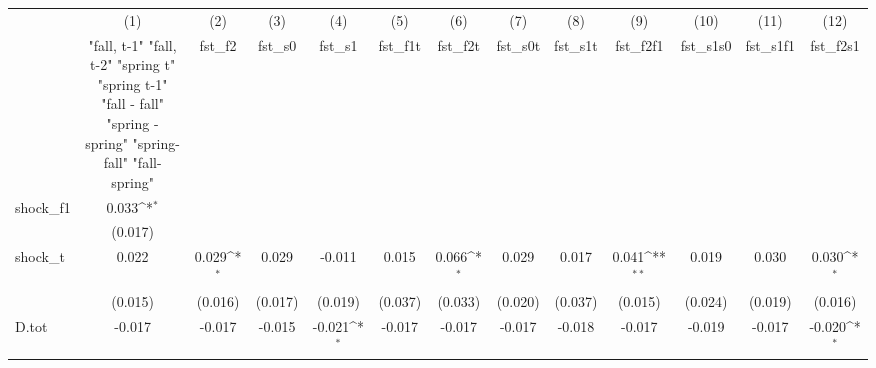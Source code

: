 {
\def\sym#1{\ifmmode^{#1}\else\(^{#1}\)\fi}
\begin{tabular}{l*{12}{c}}
\toprule
            &\multicolumn{1}{c}{(1)}&\multicolumn{1}{c}{(2)}&\multicolumn{1}{c}{(3)}&\multicolumn{1}{c}{(4)}&\multicolumn{1}{c}{(5)}&\multicolumn{1}{c}{(6)}&\multicolumn{1}{c}{(7)}&\multicolumn{1}{c}{(8)}&\multicolumn{1}{c}{(9)}&\multicolumn{1}{c}{(10)}&\multicolumn{1}{c}{(11)}&\multicolumn{1}{c}{(12)}\\
            &\multicolumn{1}{c}{  "fall, t-1" "fall, t-2" "spring t" "spring t-1"  "fall - fall" "spring - spring" "spring-fall" "fall-spring" }&\multicolumn{1}{c}{fst\_f2}&\multicolumn{1}{c}{fst\_s0}&\multicolumn{1}{c}{fst\_s1}&\multicolumn{1}{c}{fst\_f1t}&\multicolumn{1}{c}{fst\_f2t}&\multicolumn{1}{c}{fst\_s0t}&\multicolumn{1}{c}{fst\_s1t}&\multicolumn{1}{c}{fst\_f2f1}&\multicolumn{1}{c}{fst\_s1s0}&\multicolumn{1}{c}{fst\_s1f1}&\multicolumn{1}{c}{fst\_f2s1}\\
\midrule
shock\_f1    &       0.033\sym{*}  &                     &                     &                     &                     &                     &                     &                     &                     &                     &                     &                     \\
            &     (0.017)         &                     &                     &                     &                     &                     &                     &                     &                     &                     &                     &                     \\
\addlinespace
shock\_t     &       0.022         &       0.029\sym{*}  &       0.029         &      -0.011         &       0.015         &       0.066\sym{*}  &       0.029         &       0.017         &       0.041\sym{**} &       0.019         &       0.030         &       0.030\sym{*}  \\
            &     (0.015)         &     (0.016)         &     (0.017)         &     (0.019)         &     (0.037)         &     (0.033)         &     (0.020)         &     (0.037)         &     (0.015)         &     (0.024)         &     (0.019)         &     (0.016)         \\
\addlinespace
D.tot       &      -0.017         &      -0.017         &      -0.015         &      -0.021\sym{*}  &      -0.017         &      -0.017         &      -0.017         &      -0.018         &      -0.017         &      -0.019         &      -0.017         &      -0.020\sym{*}  \\

\end{tabular}}
